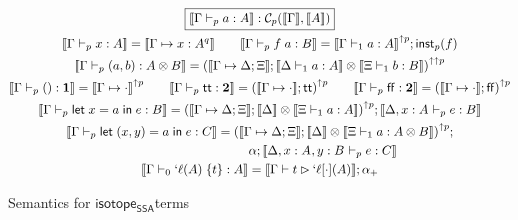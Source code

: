 \documentclass[acmsmall,screen,review]{acmart}
\newcommand{\mc}[1]{\ensuremath{\mathcal{#1}}}
\newcommand{\mb}[1]{\ensuremath{\mathbf{#1}}}
\newcommand{\ms}[1]{\ensuremath{\mathsf{#1}}}
\newcommand{\lbl}[1]{{`#1}}
\newcommand{\ctt}{\ms{tt}}
\newcommand{\cff}{\ms{ff}}
\newcommand{\letexpr}[3]{\ensuremath{\ms{let}\;#1 = #2\;\ms{in}\;#3}}
\newcommand{\bsplice}[3]{#1(#2)\;\{#3\}}
\newcommand{\lbsplice}[3]{\bsplice{\lbl{#1}}{#2}{#3}}
\newcommand{\csplits}[3]{#1 \mapsto #2;#3}
\newcommand{\cwk}[2]{#1 \mapsto #2}
\newcommand{\thyp}[3]{#1: {#2}^{#3}}
\newcommand{\lhyp}[3]{#1[#2](#3)}
\newcommand{\llhyp}[3]{\lhyp{\lbl{#1}}{#2}{#3}}
\newcommand{\hasty}[4]{#1 \vdash_{#2} #3: #4}
\newcommand{\haslb}[3]{#1 \vdash #2 \rhd #3}
\newcommand{\dnt}[1]{\llbracket{#1}\rrbracket}
\newcommand{\upg}[2]{{#1}^{\uparrow #2}}
\newcommand{\isotopessa}{\ms{isotope_{SSA}}}
\begin{document}
\begin{figure}
  \begin{gather*}
    \boxed{\dnt{\hasty{\Gamma}{p}{a}{A}}
      : \mc{C}_p(\dnt{\Gamma}, \dnt{A})} \\
    \dnt{\hasty{\Gamma}{p}{x}{A}} 
      = \dnt{\cwk{\Gamma}{\thyp{x}{A}{q}}}
      \qquad
    \dnt{\hasty{\Gamma}{p}{f\;a}{B}}
      = \upg{\dnt{\hasty{\Gamma}{1}{a}{A}}}{p}
      ; \ms{inst}_p(f) \\
    \dnt{\hasty{\Gamma}{p}{(a, b)}{A \otimes B}}
      = \upg{(
        \dnt{\csplits{\Gamma}{\Delta}{\Xi}};
        \dnt{\hasty{\Delta}{1}{a}{A}} \otimes
        \dnt{\hasty{\Xi}{1}{b}{B}}
      )}{\uparrow p} \\
    \dnt{\hasty{\Gamma}{p}{()}{\mb{1}}}
      = \upg{\dnt{\cwk{\Gamma}{\cdot}}}{p} 
      \qquad
    \dnt{\hasty{\Gamma}{p}{\ctt}{\mb{2}}}
      = \upg{(\dnt{\cwk{\Gamma}{\cdot}};\ctt)}{p}
      \qquad
    \dnt{\hasty{\Gamma}{p}{\cff}{\mb{2}}}
      = \upg{(\dnt{\cwk{\Gamma}{\cdot}};\cff)}{p} \\
    \dnt{\hasty{\Gamma}{p}{\letexpr{x}{a}{e}}{B}}
      = \upg{(
        \dnt{\csplits{\Gamma}{\Delta}{\Xi}}
        ; \dnt{\Delta} \otimes \dnt{\hasty{\Xi}{1}{a}{A}}
      )}{p};\dnt{\hasty{\Delta, \thyp{x}{A}{}}{p}{e}{B}} \\
    \dnt{\hasty{\Gamma}{p}{\letexpr{(x, y)}{a}{e}}{C}}
      = \upg{(
        \dnt{\csplits{\Gamma}{\Delta}{\Xi}}
        ; \dnt{\Delta} \otimes \dnt{\hasty{\Xi}{1}{a}{A \otimes B}}
      )}{p}
      ; 
      \\ \qquad \qquad \qquad \qquad \qquad \alpha
      ; \dnt{\hasty{\Delta, \thyp{x}{A}{}, \thyp{y}{B}{}}{p}{e}{C}}
      \\
    \dnt{\hasty{\Gamma}{0}{\lbsplice{\ell}{A}{t}}{A}}
      = \dnt{\haslb{\Gamma}{t}{\llhyp{\ell}{\cdot}{A}}};\alpha_+
  \end{gather*}
  \caption{Semantics for \isotopessa terms}
  \label{fig:ssa-structural-terms}
\end{figure}
\end{document}

